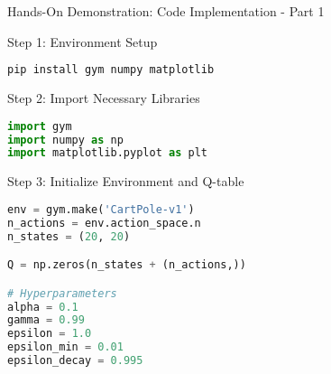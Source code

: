 \documentclass[aspectratio=169]{beamer}
\begin{document}
\begin{frame}[fragile]{Hands-On Demonstration: Code Implementation - Part 1}
    \begin{block}{Step 1: Environment Setup}
        \begin{lstlisting}[language=bash]
pip install gym numpy matplotlib
        \end{lstlisting}
    \end{block}

    \begin{block}{Step 2: Import Necessary Libraries}
        \begin{lstlisting}[language=python]
import gym
import numpy as np
import matplotlib.pyplot as plt
        \end{lstlisting}
    \end{block}

    \begin{block}{Step 3: Initialize Environment and Q-table}
        \begin{lstlisting}[language=python]
env = gym.make('CartPole-v1')
n_actions = env.action_space.n
n_states = (20, 20)

Q = np.zeros(n_states + (n_actions,))

# Hyperparameters
alpha = 0.1
gamma = 0.99
epsilon = 1.0
epsilon_min = 0.01
epsilon_decay = 0.995
        \end{lstlisting}
    \end{block}
\end{frame}
\end{document}
